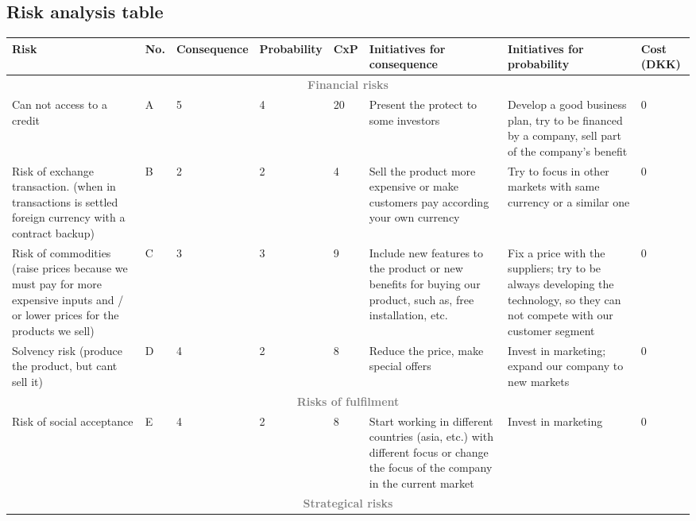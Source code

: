 \begin{landscape}
\section{Risk analysis table}
\def\arraystretch{1.5}
\begin{table}[h!]
\centering
\scriptsize
\begin{tabular}[0.8\textswidth]{|p{5cm} |p{1cm} |p{2cm} |p{2cm} |p{1cm} |p{2.8cm} |p{2.8cm} |p{2cm}|}
\hline
Risk 										&No.& Consequence	& Probability	& CxP	& Initiatives \newline for consequence	& Initiatives \newline for probability	& 	Cost (DKK) \\
\hline
\multicolumn{8}{|c|}{\normalsize{\textcolor{gray}{\textbf{Financial risks}}}}\\
\hline
Can not access to a credit					& A	& 5				&	4			& 20	& Present the protect to some investors	& Develop a good business plan, try to be financed by a company, sell part of the company's benefit	& 0\\
\hline
Risk of exchange transaction. 
(when in transactions is settled 
foreign currency with a contract backup)	& B	& 2				& 2				&  4	& Sell the product more expensive or make customers pay according your own currency
 &	Try to focus in other markets with same currency or a similar one &  0\\
\hline
Risk of commodities (raise prices because 
we  must pay for more expensive  inputs and
 / or lower prices for the products we sell)& C	& 3				& 3				& 9		& Include new features to the product or new benefits for buying our product, such as, free installation, etc.
 & Fix a price with the suppliers; try to be always developing the technology, so they can not compete with our customer segment & 0 \\
\hline
Solvency risk (produce the product, but cant sell it)	& D	& 4				& 2				& 8		& Reduce the price, make special offers & Invest in marketing; expand our company to new markets & 0 \\
\hline
\multicolumn{8}{|c|}{\normalsize{\textcolor{gray}{\textbf{Risks of fulfilment}}}}\\
\hline
Risk of social acceptance & E & 4 &  2 & 8 & Start working in different countries (asia, etc.) with different focus or change the focus of the company in the current market
& Invest in marketing &0 \\
\hline
\multicolumn{8}{|c|}{\normalsize{\textcolor{gray}{\textbf{Strategical risks}}}}\\

\end{tabular}
\end{table}
\end{landscape}
